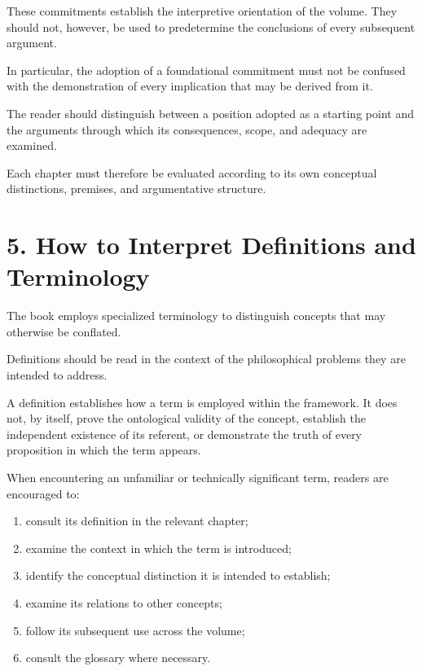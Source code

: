 These commitments establish the interpretive
orientation of the volume. They should not,
however, be used to predetermine the conclusions
of every subsequent argument.

In particular, the adoption of a foundational
commitment must not be confused with the
demonstration of every implication that may
be derived from it.

The reader should distinguish between a
position adopted as a starting point and
the arguments through which its consequences,
scope, and adequacy are examined.

Each chapter must therefore be evaluated
according to its own conceptual distinctions,
premises, and argumentative structure.


\section*{5. How to Interpret Definitions and Terminology}

The book employs specialized terminology
to distinguish concepts that may otherwise
be conflated.

Definitions should be read in the context
of the philosophical problems they are
intended to address.

A definition establishes how a term is
employed within the framework. It does
not, by itself, prove the ontological validity
of the concept, establish the independent
existence of its referent, or demonstrate
the truth of every proposition in which
the term appears.

When encountering an unfamiliar or
technically significant term, readers
are encouraged to:

\begin{enumerate}

    \item consult its definition in the
    relevant chapter;

    \item examine the context in which
    the term is introduced;

    \item identify the conceptual distinction
    it is intended to establish;

    \item examine its relations to other
    concepts;

    \item follow its subsequent use across
    the volume;

    \item consult the glossary where
    necessary.

\end{enumerate}

